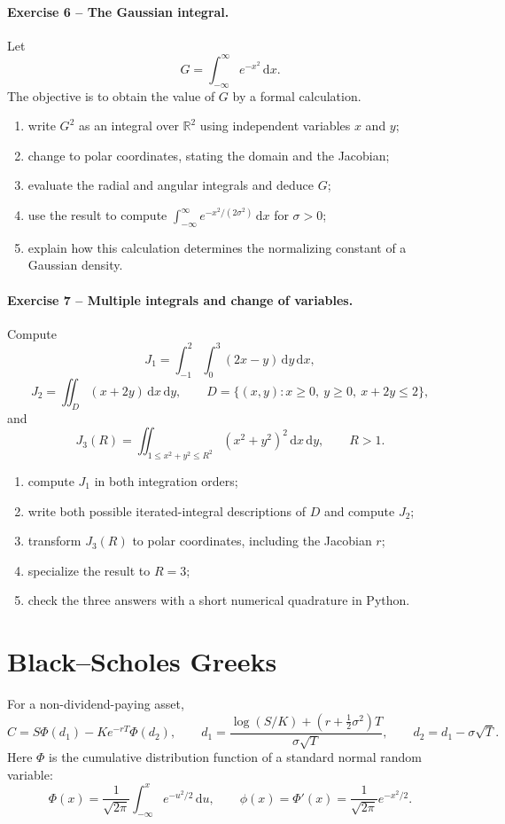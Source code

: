 \documentclass[10pt]{article}
\newcommand{\R}{\mathbb{R}}
\newcommand{\dd}{\,\mathrm{d}}
\begin{document}
\paragraph{Exercise 6 -- The Gaussian integral.}
Let
\[
G=\int_{-\infty}^{\infty}e^{-x^2}\dd x.
\]
The objective is to obtain the value of $G$ by a formal calculation.
\begin{enumerate}
\item write $G^2$ as an integral over $\R^2$ using independent variables
$x$ and $y$;
\item change to polar coordinates, stating the domain and the Jacobian;
\item evaluate the radial and angular integrals and deduce $G$;
\item use the result to compute
$\int_{-\infty}^{\infty}e^{-x^2/(2\sigma^2)}\dd x$ for $\sigma>0$;
\item explain how this calculation determines the normalizing constant of a
Gaussian density.
\end{enumerate}

\paragraph{Exercise 7 -- Multiple integrals and change of variables.}
Compute
\[
J_1=\int_{-1}^2\int_0^3(2x-y)\dd y\dd x,
\]
\[
J_2=\iint_D(x+2y)\dd x\dd y,
\qquad
D=\{(x,y):x\geq0,\ y\geq0,\ x+2y\leq2\},
\]
and
\[
J_3(R)=\iint_{1\leq x^2+y^2\leq R^2}(x^2+y^2)^2\dd x\dd y,
\qquad R>1.
\]
\begin{enumerate}
\item compute $J_1$ in both integration orders;
\item write both possible iterated-integral descriptions of $D$ and compute
$J_2$;
\item transform $J_3(R)$ to polar coordinates, including the Jacobian $r$;
\item specialize the result to $R=3$;
\item check the three answers with a short numerical quadrature in Python.
\end{enumerate}

\section{Black--Scholes Greeks}

For a non-dividend-paying asset,
\[
C=S\Phi(d_1)-Ke^{-rT}\Phi(d_2),
\qquad
d_1=\frac{\log(S/K)+(r+\tfrac12\sigma^2)T}{\sigma\sqrt T},
\qquad d_2=d_1-\sigma\sqrt T.
\]
Here $\Phi$ is the cumulative distribution function of a standard normal
random variable:
\[
\Phi(x)=\frac{1}{\sqrt{2\pi}}
\int_{-\infty}^{x}e^{-u^2/2}\dd u,
\qquad
\phi(x)=\Phi'(x)=\frac{1}{\sqrt{2\pi}}e^{-x^2/2}.
\]
\end{document}
